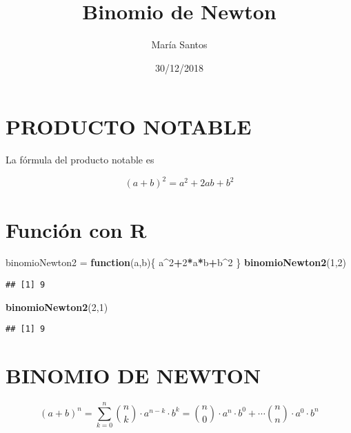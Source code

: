 \documentclass[
]{article}
\title{Binomio de Newton}
\author{María Santos}
\date{30/12/2018}
\newenvironment{Shaded}{\begin{snugshade}}{\end{snugshade}}
\newcommand{\ControlFlowTok}[1]{\textcolor[rgb]{0.13,0.29,0.53}{\textbf{#1}}}
\newcommand{\DecValTok}[1]{\textcolor[rgb]{0.00,0.00,0.81}{#1}}
\newcommand{\FunctionTok}[1]{\textcolor[rgb]{0.13,0.29,0.53}{\textbf{#1}}}
\newcommand{\NormalTok}[1]{#1}
\newcommand{\OtherTok}[1]{\textcolor[rgb]{0.56,0.35,0.01}{#1}}
\newcommand{\SpecialCharTok}[1]{\textcolor[rgb]{0.81,0.36,0.00}{\textbf{#1}}}
\begin{document}
\maketitle

\hypertarget{producto-notable}{%
\section{PRODUCTO NOTABLE}\label{producto-notable}}

La fórmula del producto notable es

\[(a+b)^2 = a^2+2ab+b^2\]

\hypertarget{funciuxf3n-con-r}{%
\section{Función con R}\label{funciuxf3n-con-r}}

\begin{Shaded}
\begin{Highlighting}[]
\NormalTok{binomioNewton2 }\OtherTok{=} \ControlFlowTok{function}\NormalTok{(a,b)\{}
\NormalTok{  a}\SpecialCharTok{\^{}}\DecValTok{2}\SpecialCharTok{+}\DecValTok{2}\SpecialCharTok{*}\NormalTok{a}\SpecialCharTok{*}\NormalTok{b}\SpecialCharTok{+}\NormalTok{b}\SpecialCharTok{\^{}}\DecValTok{2}
\NormalTok{\}}
\FunctionTok{binomioNewton2}\NormalTok{(}\DecValTok{1}\NormalTok{,}\DecValTok{2}\NormalTok{)}
\end{Highlighting}
\end{Shaded}

\begin{verbatim}
## [1] 9
\end{verbatim}

\begin{Shaded}
\begin{Highlighting}[]
\FunctionTok{binomioNewton2}\NormalTok{(}\DecValTok{2}\NormalTok{,}\DecValTok{1}\NormalTok{)}
\end{Highlighting}
\end{Shaded}

\begin{verbatim}
## [1] 9
\end{verbatim}

\hypertarget{binomio-de-newton}{%
\section{BINOMIO DE NEWTON}\label{binomio-de-newton}}

\[(a+b)^n = \sum_{k=0}^n {n\choose k}\cdot a^{n-k}\cdot b^k = {n\choose 0}\cdot a^n\cdot b^0+\cdots {n\choose n}\cdot a^0\cdot b^n\]
\end{document}
